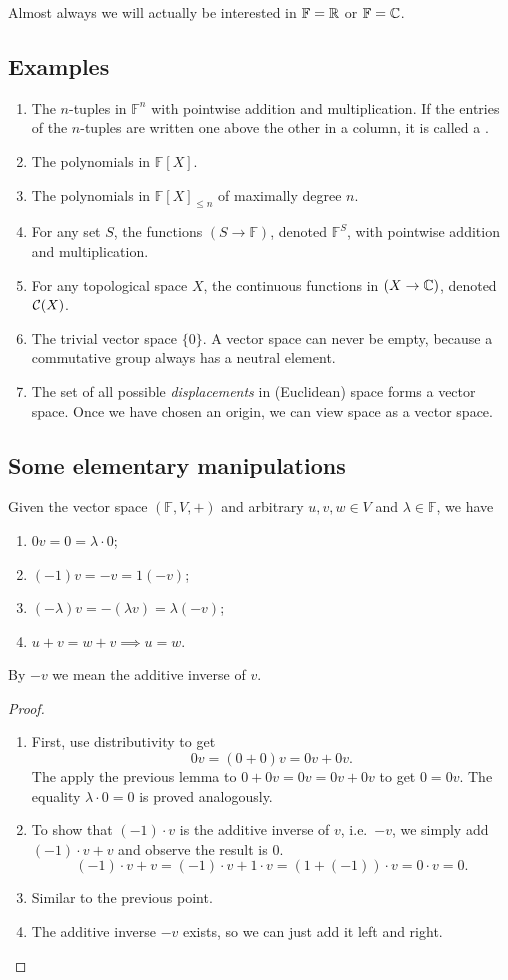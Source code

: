Almost always we will actually be interested in $\mathbb{F} = \mathbb{R}$ or $\mathbb{F} = \mathbb{C}$.
\subsection{Examples}
\begin{enumerate}
\item The $n$-tuples in $\mathbb{F}^n$ with pointwise addition and multiplication. If the entries of the $n$-tuples are written one above the other in a column, it is called a .
\item The polynomials in $\mathbb{F}[X]$.
\item The polynomials in $\mathbb{F}[X]_{\leq n}$ of maximally degree $n$.
\item For any set $S$, the functions $(S\to \mathbb{F})$, denoted $\mathbb{F}^S$, with pointwise addition and multiplication.
\item For any topological space $X$, the continuous functions in $(X\to \mathbb{C})$, denoted $\operatorname{\mathcal{C}}(X)$.
\item The trivial vector space $\{ 0\}$. A vector space can never be empty, because a commutative group always has a neutral element.
\item The set of all possible \textit{displacements} in (Euclidean) space forms a vector space. Once we have chosen an origin, we can view space as a vector space.
\end{enumerate}
\subsection{Some elementary manipulations}
\begin{lemma}
Given the vector space $(\mathbb{F}, V, +)$  and arbitrary $u,v,w\in V$ and $\lambda \in \mathbb{F}$, we have
\begin{enumerate}
\item $0v = 0 = \lambda \cdot 0$;
\item $(-1)v = -v = 1(-v)$;
\item $(-\lambda)v = -(\lambda v) = \lambda(-v)$;
\item $u+v = w+v \implies u = w$.
\end{enumerate}
By $-v$ we mean the additive inverse of $v$.
\end{lemma}
\begin{proof}
\begin{enumerate}
\item First, use distributivity to get
\[ 0v = (0+0)v = 0v + 0v. \]
The apply the previous lemma to $0+0v = 0v = 0v+0v$ to get $0=0v$. The equality $\lambda\cdot 0 = 0$ is proved analogously.
\item To show that $(-1)\cdot v$ is the additive inverse of $v$, i.e.\ $-v$, we simply add $(-1)\cdot v + v$ and observe the result is $0$.
\[ (-1)\cdot v + v = (-1)\cdot v + 1\cdot v = (1+(-1))\cdot v = 0\cdot v = 0. \]
\item Similar to the previous point.
\item The additive inverse $-v$ exists, so we can just add it left and right.
\end{enumerate}
\end{proof}

